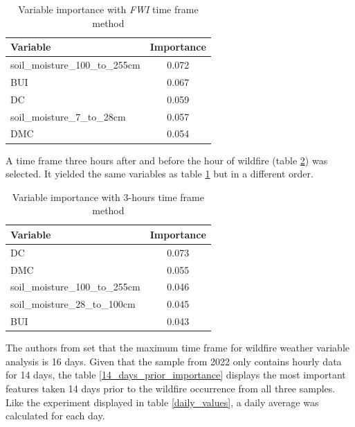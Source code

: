 \begin{table}[H]
	\centering
	\caption{Variable importance with \textit{FWI} time frame method}
	\begin{tabular}{lc}
		\hline
		Variable                       & \multicolumn{1}{l}{Importance} \\ \hline
		soil\_moisture\_100\_to\_255cm & 0.072                          \\
		BUI                            & 0.067                          \\
		DC                             & 0.059                          \\
		soil\_moisture\_7\_to\_28cm    & 0.057                          \\
		DMC                            & 0.054                         
	\end{tabular}
	\label{hourly_importance_fwix_2015_2019_2020}
\end{table}

A time frame three hours after and before the hour of wildfire (table \ref{hourly_importance_fwix_2015_2019_2020_3hours}) was selected. It yielded the same variables as table \ref{hourly_importance_fwix_2015_2019_2020} but in a different order.

\begin{table}[H]
	\centering
	\caption{Variable importance with 3-hours time frame method}
	\begin{tabular}{lc}
		\hline
		Variable                       & \multicolumn{1}{l}{Importance} \\ \hline
		DC & 0.073                          \\
		DMC                            & 0.055                          \\
		soil\_moisture\_100\_to\_255cm                             & 0.046                          \\
		soil\_moisture\_28\_to\_100cm    & 0.045                          \\
		BUI                            & 0.043                         
	\end{tabular}
	\label{hourly_importance_fwix_2015_2019_2020_3hours}
\end{table}


The authors from \cite{wang2023improving} set that the maximum time frame for wildfire weather variable analysis is 16 days. Given that the sample from 2022 only contains hourly data for 14 days, the table \ref{14_days_prior_importance} displays the most important features taken 14 days prior to the wildfire occurrence from all three samples. Like the experiment displayed in table \ref{daily_values}, a daily average was calculated for each day.

